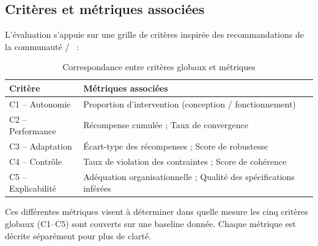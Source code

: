 \subsection{Critères et métriques associées}\label{sec:criteria_metrics}
L'évaluation s'appuie sur une grille de critères inspirée des recommandations de la communauté /~\cite{papoudakis2021agent} :

\begin{table}[h!]
  \centering
  \caption{Correspondance entre critères globaux et métriques}
  \renewcommand{\arraystretch}{1.2}
  \begin{tabular}{ll}
    \hline
    \textbf{Critère}    & \textbf{Métriques associées}                                       \\
    \hline
    C1 -- Autonomie     & Proportion d'intervention (conception / fonctionnement)            \\
    C2 -- Performance   & Récompense cumulée ; Taux de convergence                           \\
    C3 -- Adaptation    & Écart-type des récompenses ; Score de robustesse                   \\
    C4 -- Contrôle      & Taux de violation des contraintes ; Score de cohérence             \\
    C5 -- Explicabilité & Adéquation organisationnelle ; Qualité des spécifications inférées \\
    \hline
  \end{tabular}
  \label{tab:grille}
\end{table}

Ces différentes métriques visent à déterminer dans quelle mesure les cinq critères globaux (C1--C5) sont couverts sur une baseline donnée.
Chaque métrique est décrite séparément pour plus de clarté.


